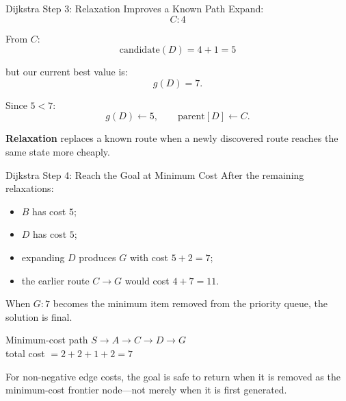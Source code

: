 \documentclass[aspectratio=169,10pt]{beamer}
\begin{document}
\begin{frame}[shrink=20]{Dijkstra Step 3: Relaxation Improves a Known Path}
  Expand:
  \[
    C:4
  \]

  From $C$:
  \[
    \text{candidate}(D)=4+1=5
  \]

  but our current best value is:
  \[
    g(D)=7.
  \]

  Since $5<7$:
  \[
    g(D)\leftarrow 5,
    \qquad
    \mathrm{parent}[D]\leftarrow C.
  \]

  \begin{keyidea}
    \textbf{Relaxation} replaces a known route when a newly discovered route reaches the same state more cheaply.
  \end{keyidea}
\end{frame}

\begin{frame}[shrink=20]{Dijkstra Step 4: Reach the Goal at Minimum Cost}
  After the remaining relaxations:
  \begin{itemize}
    \item $B$ has cost $5$;
    \item $D$ has cost $5$;
    \item expanding $D$ produces $G$ with cost $5+2=7$;
    \item the earlier route $C\rightarrow G$ would cost $4+7=11$.
  \end{itemize}

  When $G:7$ becomes the minimum item removed from the priority queue, the solution is final.

  \begin{block}{Minimum-cost path}
    \centering
    $S\rightarrow A\rightarrow C\rightarrow D\rightarrow G$\\[0.08in]
    total cost $=2+2+1+2=7$
  \end{block}

  \begin{keyidea}
    For non-negative edge costs, the goal is safe to return when it is removed as the minimum-cost frontier node---not merely when it is first generated.
  \end{keyidea}
\end{frame}
\end{document}
